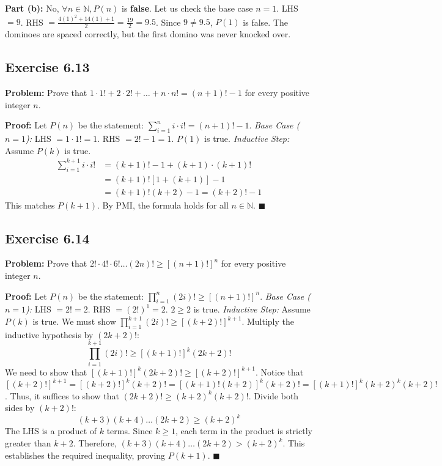 \documentclass[11pt, a4paper]{article}
\theoremstyle{definition}
\theoremstyle{remark}
\newcommand{\N}{\mathbb{N}}
\begin{document}
\textbf{Part (b):} No, $\forall n \in \N, P(n)$ is \textbf{false}. Let us check the base case $n=1$.
LHS $= 9$. RHS $= \frac{4(1)^2 + 14(1) + 1}{2} = \frac{19}{2} = 9.5$.
Since $9 \neq 9.5$, $P(1)$ is false. The dominoes are spaced correctly, but the first domino was never knocked over.

\subsection*{Exercise 6.13}
\textbf{Problem:} Prove that $1 \cdot 1! + 2 \cdot 2! + \dots + n \cdot n! = (n+1)! - 1$ for every positive integer $n$.

\textbf{Proof:}
Let $P(n)$ be the statement: $\sum_{i=1}^n i \cdot i! = (n+1)! - 1$.
\textit{Base Case ($n=1$):} LHS $= 1 \cdot 1! = 1$. RHS $= 2! - 1 = 1$. $P(1)$ is true.
\textit{Inductive Step:} Assume $P(k)$ is true.
\[
\begin{aligned}
\sum_{i=1}^{k+1} i \cdot i! &= (k+1)! - 1 + (k+1) \cdot (k+1)! \\
&= (k+1)! \left[ 1 + (k+1) \right] - 1 \\
&= (k+1)! (k+2) - 1 = (k+2)! - 1
\end{aligned}
\]
This matches $P(k+1)$. By PMI, the formula holds for all $n \in \N$. \hfill $\blacksquare$

\subsection*{Exercise 6.14}
\textbf{Problem:} Prove that $2! \cdot 4! \cdot 6! \dots (2n)! \ge [(n+1)!]^n$ for every positive integer $n$.

\textbf{Proof:}
Let $P(n)$ be the statement: $\prod_{i=1}^n (2i)! \ge [(n+1)!]^n$.
\textit{Base Case ($n=1$):} LHS $= 2! = 2$. RHS $= (2!)^1 = 2$. $2 \ge 2$ is true.
\textit{Inductive Step:} Assume $P(k)$ is true. We must show $\prod_{i=1}^{k+1} (2i)! \ge [(k+2)!]^{k+1}$.
Multiply the inductive hypothesis by $(2k+2)!$:
\[
\prod_{i=1}^{k+1} (2i)! \ge [(k+1)!]^k (2k+2)!
\]
We need to show that $[(k+1)!]^k (2k+2)! \ge [(k+2)!]^{k+1}$.
Notice that $[(k+2)!]^{k+1} = [(k+2)!]^k (k+2)! = [(k+1)! (k+2)]^k (k+2)! = [(k+1)!]^k (k+2)^k (k+2)!$.
Thus, it suffices to show that $(2k+2)! \ge (k+2)^k (k+2)!$.
Divide both sides by $(k+2)!$:
\[
(k+3)(k+4)\dots(2k+2) \ge (k+2)^k
\]
The LHS is a product of $k$ terms. Since $k \ge 1$, each term in the product is strictly greater than $k+2$.
Therefore, $(k+3)(k+4)\dots(2k+2) > (k+2)^k$.
This establishes the required inequality, proving $P(k+1)$. \hfill $\blacksquare$
\end{document}
